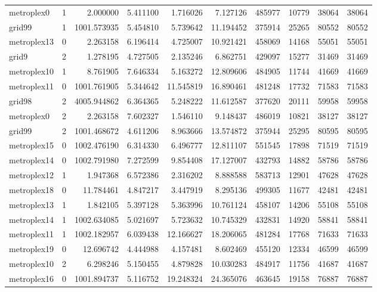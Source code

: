 \begin{longtable}{|l|r|r|r|r|r|r|r|r|r|}
metroplex0 & 1 & 2.000000 & 5.411100 & 1.716026 & 7.127126 & 485977 & 10779 & 38064 & 38064 \\
grid99 & 1 & 1001.573935 & 5.454810 & 5.739642 & 11.194452 & 375914 & 25265 & 80552 & 80552 \\
metroplex13 & 0 & 2.263158 & 6.196414 & 4.725007 & 10.921421 & 458069 & 14168 & 55051 & 55051 \\
grid9 & 2 & 1.278195 & 4.727505 & 2.135246 & 6.862751 & 429097 & 15277 & 31469 & 31469 \\
metroplex10 & 1 & 8.761905 & 7.646334 & 5.163272 & 12.809606 & 484905 & 11744 & 41669 & 41669 \\
metroplex11 & 0 & 1001.761905 & 5.344642 & 11.545819 & 16.890461 & 481248 & 17732 & 71583 & 71583 \\
grid98 & 2 & 4005.944862 & 6.364365 & 5.248222 & 11.612587 & 377620 & 20111 & 59958 & 59958 \\
metroplex0 & 2 & 2.263158 & 7.602327 & 1.546110 & 9.148437 & 486019 & 10821 & 38127 & 38127 \\
grid99 & 2 & 1001.468672 & 4.611206 & 8.963666 & 13.574872 & 375944 & 25295 & 80595 & 80595 \\
metroplex15 & 0 & 1002.476190 & 6.314330 & 6.496777 & 12.811107 & 551545 & 17898 & 71519 & 71519 \\
metroplex14 & 0 & 1002.791980 & 7.272599 & 9.854408 & 17.127007 & 432793 & 14882 & 58786 & 58786 \\
metroplex12 & 1 & 1.947368 & 6.572386 & 2.316202 & 8.888588 & 583713 & 12901 & 47628 & 47628 \\
metroplex18 & 0 & 11.784461 & 4.847217 & 3.447919 & 8.295136 & 499305 & 11677 & 42481 & 42481 \\
metroplex13 & 1 & 1.842105 & 5.397128 & 5.363996 & 10.761124 & 458107 & 14206 & 55108 & 55108 \\
metroplex14 & 1 & 1002.634085 & 5.021697 & 5.723632 & 10.745329 & 432831 & 14920 & 58841 & 58841 \\
metroplex11 & 1 & 1002.182957 & 6.039438 & 12.166627 & 18.206065 & 481284 & 17768 & 71633 & 71633 \\
metroplex19 & 0 & 12.696742 & 4.444988 & 4.157481 & 8.602469 & 455120 & 12334 & 46599 & 46599 \\
metroplex10 & 2 & 6.298246 & 5.150455 & 4.879828 & 10.030283 & 484917 & 11756 & 41687 & 41687 \\
metroplex16 & 0 & 1001.894737 & 5.116752 & 19.248324 & 24.365076 & 463645 & 19158 & 76887 & 76887 \\

\end{longtable}
